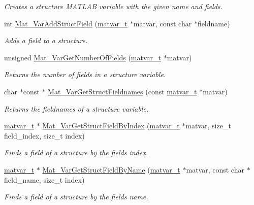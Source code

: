 \begin{DoxyCompactItemize}
\begin{DoxyCompactList}\small\item\em Creates a structure M\+A\+T\+L\+AB variable with the given name and fields. \end{DoxyCompactList}\item 
int \hyperlink{group___m_a_t_gaef5689cace7c4165c3cbf8fa17d1ebcd}{Mat\+\_\+\+Var\+Add\+Struct\+Field} (\hyperlink{group___m_a_t_structmatvar__t}{matvar\+\_\+t} $\ast$matvar, const char $\ast$fieldname)
\begin{DoxyCompactList}\small\item\em Adds a field to a structure. \end{DoxyCompactList}\item 
unsigned \hyperlink{group___m_a_t_ga06ba20aa758543d53dc83a1ccbdc2efc}{Mat\+\_\+\+Var\+Get\+Number\+Of\+Fields} (\hyperlink{group___m_a_t_structmatvar__t}{matvar\+\_\+t} $\ast$matvar)
\begin{DoxyCompactList}\small\item\em Returns the number of fields in a structure variable. \end{DoxyCompactList}\item 
char $\ast$const  $\ast$ \hyperlink{group___m_a_t_ga88bc328e59ce1dd8f43e917c07140803}{Mat\+\_\+\+Var\+Get\+Struct\+Fieldnames} (const \hyperlink{group___m_a_t_structmatvar__t}{matvar\+\_\+t} $\ast$matvar)
\begin{DoxyCompactList}\small\item\em Returns the fieldnames of a structure variable. \end{DoxyCompactList}\item 
\hyperlink{group___m_a_t_structmatvar__t}{matvar\+\_\+t} $\ast$ \hyperlink{group___m_a_t_ga03ab2d89f683f9ccb4785fb255b14e0b}{Mat\+\_\+\+Var\+Get\+Struct\+Field\+By\+Index} (\hyperlink{group___m_a_t_structmatvar__t}{matvar\+\_\+t} $\ast$matvar, size\+\_\+t field\+\_\+index, size\+\_\+t index)
\begin{DoxyCompactList}\small\item\em Finds a field of a structure by the field\textquotesingle{}s index. \end{DoxyCompactList}\item 
\hyperlink{group___m_a_t_structmatvar__t}{matvar\+\_\+t} $\ast$ \hyperlink{group___m_a_t_ga619d241b49ce97334a38add60562c7be}{Mat\+\_\+\+Var\+Get\+Struct\+Field\+By\+Name} (\hyperlink{group___m_a_t_structmatvar__t}{matvar\+\_\+t} $\ast$matvar, const char $\ast$field\+\_\+name, size\+\_\+t index)
\begin{DoxyCompactList}\small\item\em Finds a field of a structure by the field\textquotesingle{}s name. \end{DoxyCompactList}\item 

\end{DoxyCompactItemize}
